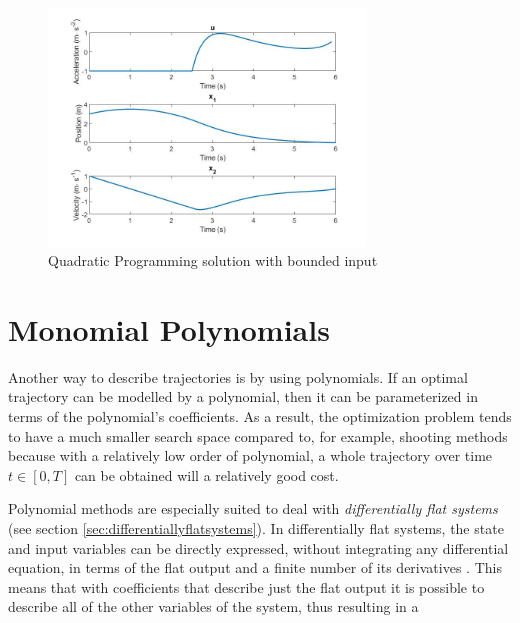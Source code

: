 \begin{figure}[h!]
\centering
\includegraphics[width=0.75\textwidth]{Images/quad_prog_constrained.jpg}
\caption{Quadratic Programming solution with bounded input}
\label{fig:solution_quad_prog_con}
\end{figure}


\section{Monomial Polynomials}

\par Another way to describe trajectories is by using polynomials. If an optimal trajectory can be modelled by a polynomial, then it can be parameterized in terms of the polynomial's coefficients. As a result, the optimization problem tends to have a much smaller search space compared to, for example, shooting methods because with a relatively low order of polynomial, a whole trajectory over time $t\in [0,T]$ can be obtained will a relatively good cost. 
\par Polynomial methods are especially suited to deal with \textit{differentially flat systems} (see section \ref{sec:differentiallyflatsystems}). In differentially flat systems, the state and input variables can be directly expressed, without integrating any differential equation, in terms of the flat output and a finite number of its derivatives \cite{fliess1995flatness}. This means that with coefficients that describe just the flat output it is possible to describe all of the other variables of the system, thus resulting in a 

